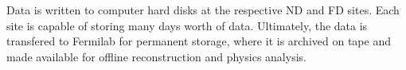 Data is written to computer hard disks at the respective ND and FD sites.  Each site is capable of storing many days worth of data.  Ultimately, the data is transfered to Fermilab for permanent storage, where it is archived on tape and made available for offline reconstruction and physics analysis.




